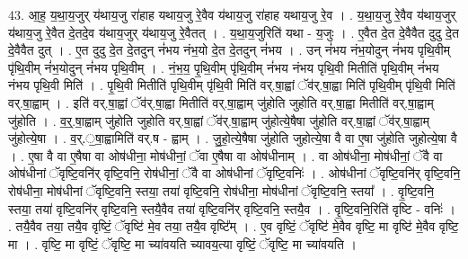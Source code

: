 \documentclass[17pt]{extarticle}
\begin{document}
43. आ॒ह॒ य॒था॒य॒जुर् य॑थाय॒जु रा॑हाह यथाय॒जु रे॒वैव य॑थाय॒जु रा॑हाह यथाय॒जु रे॒व । . य॒था॒य॒जु रे॒वैव य॑थाय॒जुर् य॑थाय॒जु रे॒वैत दे॒तदे॒व य॑थाय॒जुर् य॑थाय॒जु रे॒वैतत् । . य॒था॒य॒जुरिति॑ यथा - य॒जुः । . ए॒वैत दे॒त दे॒वैवैत दुदु दे॒त दे॒वैवैत दुत् । . ए॒त दुदु दे॒त दे॒तदुन् नं॑भय नंभ॒यो दे॒त दे॒तदुन् नं॑भय । . उन् नं॑भय नंभ॒योदुन् नं॑भय पृथि॒वीम् पृ॑थि॒वीम् नं॑भ॒योदुन् नं॑भय पृथि॒वीम् । . नं॒भ॒य॒ पृ॒थि॒वीम् पृ॑थि॒वीम् नं॑भय नंभय पृथि॒वी मितीति॑ पृथि॒वीम् नं॑भय नंभय पृथि॒वी मिति॑ । . पृ॒थि॒वी मितीति॑ पृथि॒वीम् पृ॑थि॒वी मिति॑ वर्.षा॒ह्वां ॅव॑र्.षा॒ह्वा मिति॑ पृथि॒वीम् पृ॑थि॒वी मिति॑ वर्.षा॒ह्वाम् । . इति॑ वर्.षा॒ह्वां ॅव॑र्.षा॒ह्वा मितीति॑ वर्.षा॒ह्वाम् जु॑होति जुहोति वर्.षा॒ह्वा मितीति॑ वर्.षा॒ह्वाम् जु॑होति । . व॒र्॒.षा॒ह्वाम् जु॑होति जुहोति वर्.षा॒ह्वां ॅव॑र्.षा॒ह्वाम् जु॑होत्ये॒षैषा जु॑होति वर्.षा॒ह्वां ॅव॑र्.षा॒ह्वाम् जु॑होत्ये॒षा । . व॒र्.॒षा॒ह्वामिति॑ वर्.ष - ह्वाम् । . जु॒हो॒त्ये॒षैषा जु॑होति जुहोत्ये॒षा वै वा ए॒षा जु॑होति जुहोत्ये॒षा वै । . ए॒षा वै वा ए॒षैषा वा ओष॑धीना॒ मोष॑धीनां॒ ॅवा ए॒षैषा वा ओष॑धीनाम् । . वा ओष॑धीना॒ मोष॑धीनां॒ ॅवै वा ओष॑धीनां ॅवृष्टि॒वनि॑र् वृष्टि॒वनि॒ रोष॑धीनां॒ ॅवै वा ओष॑धीनां ॅवृष्टि॒वनिः॑ । . ओष॑धीनां ॅवृष्टि॒वनि॑र् वृष्टि॒वनि॒ रोष॑धीना॒ मोष॑धीनां ॅवृष्टि॒वनि॒ स्तया॒ तया॑ वृष्टि॒वनि॒ रोष॑धीना॒ मोष॑धीनां ॅवृष्टि॒वनि॒ स्तया᳚ । . वृ॒ष्टि॒वनि॒ स्तया॒ तया॑ वृष्टि॒वनि॑र् वृष्टि॒वनि॒ स्तयै॒वैव तया॑ वृष्टि॒वनि॑र् वृष्टि॒वनि॒ स्तयै॒व । . वृ॒ष्टि॒वनि॒रिति॑ वृष्टि - वनिः॑ । . तयै॒वैव तया॒ तयै॒व वृष्टिं॒ ॅवृष्टि॑ मे॒व तया॒ तयै॒व वृष्टि᳚म् । . ए॒व वृष्टिं॒ ॅवृष्टि॑ मे॒वैव वृष्टि॒ मा वृष्टि॑ मे॒वैव वृष्टि॒ मा । . वृष्टि॒ मा वृष्टिं॒ ॅवृष्टि॒ मा च्या॑वयति च्यावय॒त्या वृष्टिं॒ ॅवृष्टि॒ मा च्या॑वयति । \newline
\end{document}
